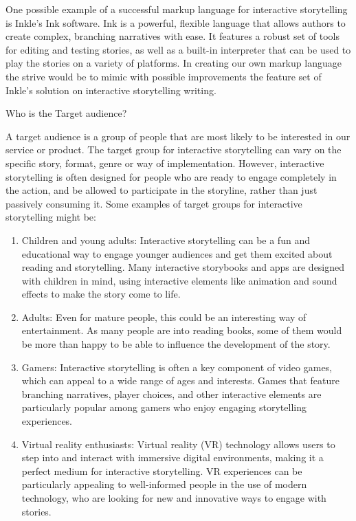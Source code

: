 One possible example of a successful markup language for interactive storytelling is Inkle's Ink software. Ink is a powerful, flexible language that allows authors to create complex, branching narratives with ease. It features a robust set of tools for editing and testing stories, as well as a built-in interpreter that can be used to play the stories on a variety of platforms. In creating our own markup language the strive would be to mimic with possible improvements the feature set of Inkle’s solution on interactive storytelling writing.

\noindent Who is the Target audience?

A target audience is a group of people that are most likely to be interested in our service or product. The target group for interactive storytelling can vary on the specific story, format, genre or way of implementation. However, interactive storytelling is often designed for people who are ready to engage completely in the action, and be allowed to participate in the storyline, rather than just passively consuming it.
Some examples of target groups for interactive storytelling might be:

 \begin{enumerate}
                 \item Children and young adults: Interactive storytelling can be a fun and educational way to engage younger audiences and get them excited about reading and storytelling. Many interactive storybooks and apps are designed with children in mind, using interactive elements like animation and sound effects to make the story come to life.
                 \item Adults: Even for mature people, this could be an interesting way of entertainment. As many people are into reading books, some of them would be more than happy to be able to influence the development of the story.
                 \item Gamers: Interactive storytelling is often a key component of video games, which can appeal to a wide range of ages and interests. Games that feature branching narratives, player choices, and other interactive elements are particularly popular among gamers who enjoy engaging storytelling experiences.
                 \item Virtual reality enthusiasts: Virtual reality (VR) technology allows users to step into and interact with immersive digital environments, making it a perfect medium for interactive storytelling. VR experiences can be particularly appealing to well-informed people in the use of modern technology, who are looking for new and innovative ways to engage with stories.
 \end{enumerate}

